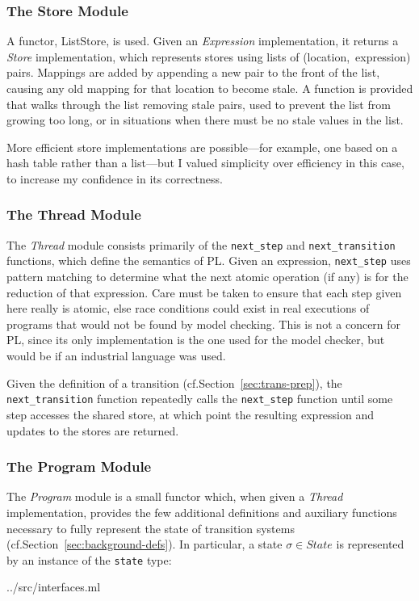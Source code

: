 \documentclass[12pt,a4paper,twoside,openany]{report}
\begin{document}
\subsubsection{The Store Module}
A functor, ListStore, is used. Given an
\emph{Expression} implementation, it
returns a \emph{Store} implementation, which
represents stores using lists of
(location,~expression) pairs. Mappings
are added by appending a new pair to
the front of the list, causing any old
mapping for that location to become stale.
A function is provided that walks through
the list removing stale pairs, used to
prevent the list from growing too long,
or in situations when there must be
no stale values in the list.

More efficient store implementations are
possible---for example, one based on
a hash table rather than a list---but
I valued simplicity over efficiency
in this case,
to increase my confidence in its correctness.

\subsubsection{The Thread Module}
The \emph{Thread} module consists primarily of
the \texttt{next\_step} and \texttt{next\_transition}
functions, which define the semantics of PL.
Given an expression, \texttt{next\_step} uses pattern
matching to determine what the next atomic
operation (if any) is for the reduction
of that expression.
Care must be taken to
ensure that each step given here really is
atomic, else race conditions could exist
in real executions of programs that would
not be found by model checking. This
is not a concern for PL, since its only
implementation is the one used for the
model checker, but would be if
an industrial language was used.

Given the definition
of a transition (cf.\@ Section~\ref{sec:trans-prep}),
the \texttt{next\_transition}
function repeatedly calls the \texttt{next\_step}
function until some step accesses the shared
store, at which point the resulting expression
and updates to the stores are returned.

\subsubsection{The Program Module}
The \emph{Program} module is a small functor which,
when given a \emph{Thread} implementation, provides 
the few additional definitions and auxiliary
functions necessary to fully represent the state of
transition systems (cf.\@ Section~\ref{sec:background-defs}).
In particular, a state $\sigma \in \textit{State}$ is
represented by an instance of the \texttt{state} type:

	{../src/interfaces.ml}
\end{document}
